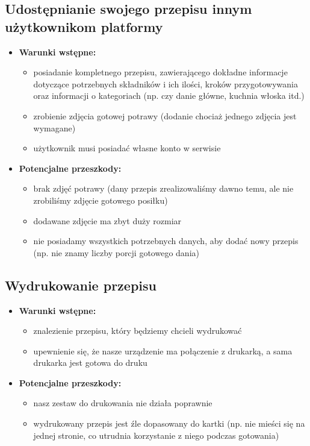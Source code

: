 \documentclass{article}
\begin{document}
\subsection{Udostępnianie swojego przepisu innym użytkownikom platformy}
  \begin{itemize}
    \item \textbf{Warunki wstępne:}
      \begin{itemize}
        \item posiadanie kompletnego przepisu, zawierającego dokładne informacje dotyczące potrzebnych składników i ich ilości, kroków przygotowywania oraz informacji o kategoriach (np. czy danie główne, kuchnia włoska itd.)
        \item zrobienie zdjęcia gotowej potrawy (dodanie chociaż jednego zdjęcia jest wymagane)
        \item użytkownik musi posiadać własne konto w serwisie
      \end{itemize}
    \item \textbf{Potencjalne przeszkody:}
      \begin{itemize}
        \item brak zdjęć potrawy (dany przepis zrealizowaliśmy dawno temu, ale nie zrobiliśmy zdjęcie gotowego posiłku)
        \item dodawane zdjęcie ma zbyt duży rozmiar
        \item nie posiadamy wszystkich potrzebnych danych, aby dodać nowy przepis (np. nie znamy liczby porcji gotowego dania)
      \end{itemize}
  \end{itemize}
\subsection{Wydrukowanie przepisu}
  \begin{itemize}
    \item \textbf{Warunki wstępne:}
      \begin{itemize}
        \item znalezienie przepisu, który będziemy chcieli wydrukować
        \item upewnienie się, że nasze urządzenie ma połączenie z drukarką, a sama drukarka jest gotowa do druku
      \end{itemize}
    \item \textbf{Potencjalne przeszkody:}
      \begin{itemize}
        \item nasz zestaw do drukowania nie działa poprawnie
        \item wydrukowany przepis jest źle dopasowany do kartki (np. nie mieści się na jednej stronie, co utrudnia korzystanie z niego podczas gotowania)
      \end{itemize}
  \end{itemize}
\end{document}

